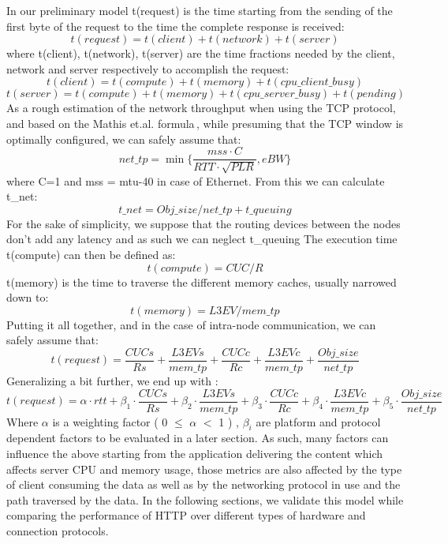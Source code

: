 \documentclass[runningheads]{llncs}
\begin{document}
In our preliminary model t(request) is the time starting from the sending of the first byte of the request to the time the complete response is received:
\begin{equation}
t(request) = t(client) + t(network) + t(server)
\end{equation}
 where t(client), t(network), t(server) are the time fractions needed by the client, network and server respectively to accomplish the request:
\begin{equation}
t(client) = t(compute) + t(memory) + t(cpu\_client\_busy)
\end{equation}
\begin{equation}
t(server) = t(compute) + t(memory) + t(cpu\_server\_busy) + t(pending)
\end{equation}
As a rough estimation of the network throughput when using the TCP protocol, and based on the Mathis et.al. formula\,\cite{predictability}, while presuming that the TCP window is optimally configured, we can safely assume that:
\begin{equation}
net\_tp= \min\{\frac{mss\cdot C}{RTT \cdot \sqrt{PLR}}, eBW\}
\label{eq:net-tp}
\end{equation}
where C=1 and mss = mtu-40 in case of Ethernet.
From this we can calculate t\_net:
\begin{equation}
 t\_net=Obj\_size / net\_tp + t\_queuing
\end{equation}
For the sake of simplicity, we suppose that the routing devices between the nodes don’t add any latency and as such we can neglect t\_queuing
The execution time t(compute) can then be defined as:
\begin{equation}
t(compute) = CUC /R
\end{equation}
t(memory) is the time to traverse the different memory caches, usually narrowed down to:
\begin{equation}
t(memory)=L3EV/mem\_tp
\end{equation}
Putting it all together, and in the case of intra-node communication, we can safely assume that:
\begin{equation}
t(request)=\frac{CUCs}{Rs}+\frac{L3EVs}{mem\_tp}+\frac{CUCc}{Rc}+\frac{L3EVc}{mem\_tp}+\frac{Obj\_size}{net\_tp}
\end{equation}
Generalizing a bit further, we end up with :
\begin{equation}
\label{eq:model}
t(request)=\alpha\cdot rtt+\beta_1\cdot\frac{CUCs}{Rs}+\beta_2\cdot\frac{L3EVs}{mem\_tp}+\beta_3\cdot\frac{CUCc}{Rc}+\beta_4\cdot\frac{L3EVc}{mem\_tp}+\beta_5\cdot\frac{Obj\_size}{net\_tp}
\end{equation}
Where $\alpha$ is a weighting factor ( 0 $\leq$ $\alpha$ $<$ 1 ) \cite{rfc6298}, $\beta_i$ are platform and protocol dependent factors to be evaluated in a later section.
As such, many factors can influence the above starting from the application delivering the content which affects server CPU and memory usage, those metrics are also affected by the type of client consuming the data as well as by the networking protocol in use and the path traversed by the data. In the following sections, we validate this model while comparing the performance of HTTP over different types of hardware and connection protocols.
\end{document}
